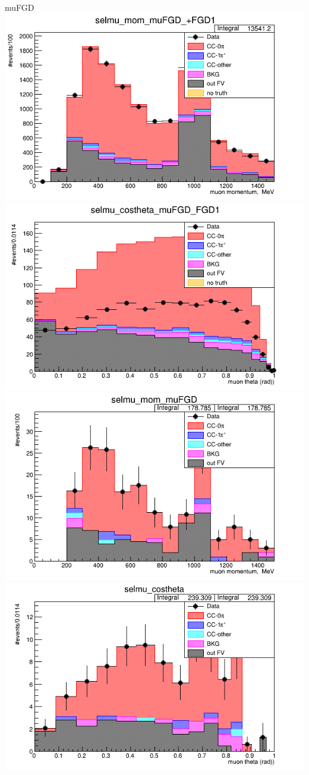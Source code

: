 \documentclass{beamer}
\begin{document}
\begin{frame}{muFGD}
\center
\includegraphics[width=.45\textwidth]{images/selmu_mom_topology_muFGD_accum_level[][0][49]_data_mc.png}
\includegraphics[width=.45\textwidth]{images/selmu_costheta_topology_muFGD_accum_level[][0][49]_data_mc.png}
\includegraphics[width=.45\textwidth]{images/selmu_mom_fgd2topology_muFGD_accum_level[][1][49]_data_mc.png}
\includegraphics[width=.45\textwidth]{images/selmu_costheta_fgd2topology_muFGD_accum_level[][1][49]_data_mc.png}
\end{frame}
\end{document}
